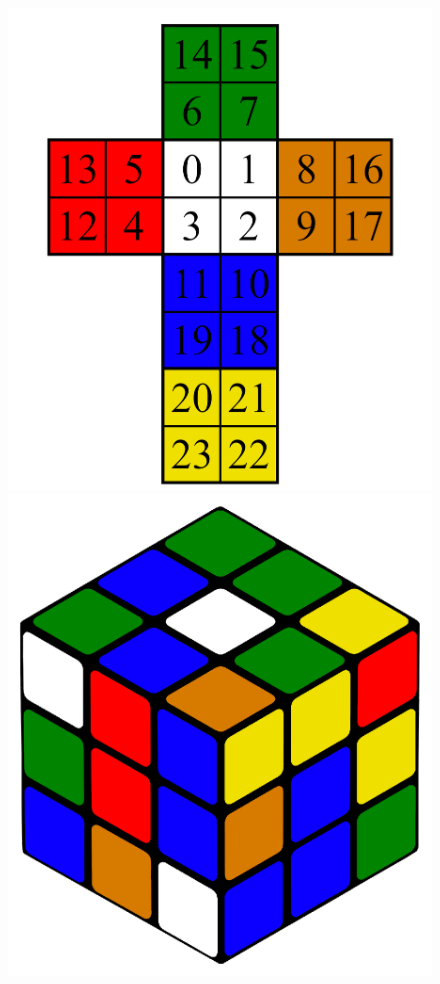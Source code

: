 \documentclass[12pt,a4paper, usenames, dvipsnames]{scrartcl}
\begin{document}
\begin{figure}[h]
\includegraphics[scale=0.04]{2x2foldedout.png} \\
\includegraphics[scale=0.04]{3x3scrambled.png}

\end{figure}
\end{document}
